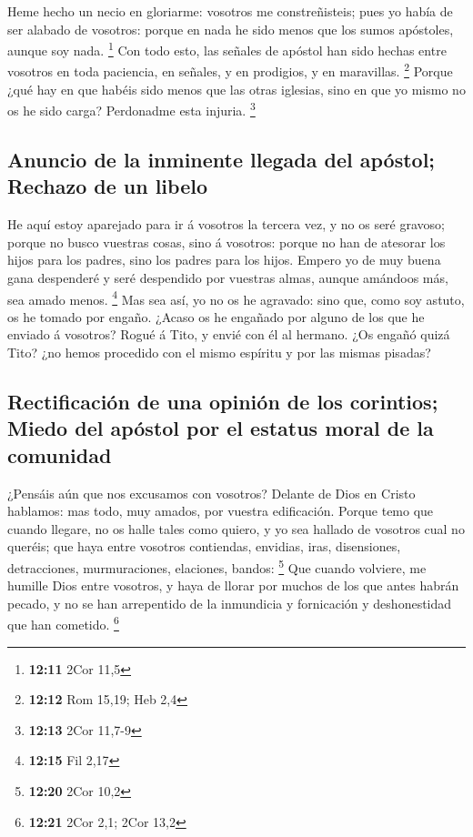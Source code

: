  Heme hecho un necio en gloriarme: vosotros me
constreñisteis; pues yo había de ser alabado de vosotros: porque en nada
he sido menos que los sumos apóstoles, aunque soy nada. \footnote{\textbf{12:11}
  2Cor 11,5}  Con todo esto, las señales de apóstol han
sido hechas entre vosotros en toda paciencia, en señales, y en
prodigios, y en maravillas. \footnote{\textbf{12:12} Rom 15,19; Heb 2,4}
 Porque ¿qué hay en que habéis sido menos que las otras
iglesias, sino en que yo mismo no os he sido carga? Perdonadme esta
injuria. \footnote{\textbf{12:13} 2Cor 11,7-9}

\hypertarget{anuncio-de-la-inminente-llegada-del-apuxf3stol-rechazo-de-un-libelo}{%
\subsection{Anuncio de la inminente llegada del apóstol; Rechazo de un
libelo}\label{anuncio-de-la-inminente-llegada-del-apuxf3stol-rechazo-de-un-libelo}}

 He aquí estoy aparejado para ir á vosotros la tercera vez,
y no os seré gravoso; porque no busco vuestras cosas, sino á vosotros:
porque no han de atesorar los hijos para los padres, sino los padres
para los hijos.  Empero yo de muy buena gana despenderé y
seré despendido por vuestras almas, aunque amándoos más, sea amado
menos. \footnote{\textbf{12:15} Fil 2,17}  Mas sea así, yo
no os he agravado: sino que, como soy astuto, os he tomado por engaño.
 ¿Acaso os he engañado por alguno de los que he enviado á
vosotros?  Rogué á Tito, y envié con él al hermano. ¿Os
engañó quizá Tito? ¿no hemos procedido con el mismo espíritu y por las
mismas pisadas?

\hypertarget{rectificaciuxf3n-de-una-opiniuxf3n-de-los-corintios-miedo-del-apuxf3stol-por-el-estatus-moral-de-la-comunidad}{%
\subsection{Rectificación de una opinión de los corintios; Miedo del
apóstol por el estatus moral de la
comunidad}\label{rectificaciuxf3n-de-una-opiniuxf3n-de-los-corintios-miedo-del-apuxf3stol-por-el-estatus-moral-de-la-comunidad}}

 ¿Pensáis aún que nos excusamos con vosotros? Delante de
Dios en Cristo hablamos: mas todo, muy amados, por vuestra edificación.
 Porque temo que cuando llegare, no os halle tales como
quiero, y yo sea hallado de vosotros cual no queréis; que haya entre
vosotros contiendas, envidias, iras, disensiones, detracciones,
murmuraciones, elaciones, bandos: \footnote{\textbf{12:20} 2Cor 10,2}
 Que cuando volviere, me humille Dios entre vosotros, y
haya de llorar por muchos de los que antes habrán pecado, y no se han
arrepentido de la inmundicia y fornicación y deshonestidad que han
cometido. \footnote{\textbf{12:21} 2Cor 2,1; 2Cor 13,2}

